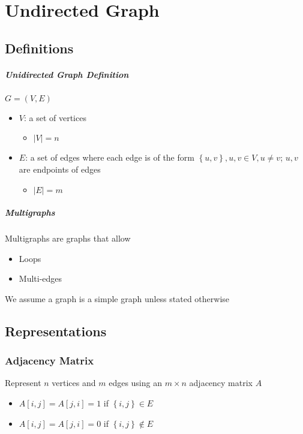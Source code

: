 \chapter{Undirected Graph}

\section{Definitions}

  \paragraph{Unidirected Graph Definition} $ G = \left( V, E \right) $
  \begin{itemize}
    \item $ V $: a set of vertices
    \begin{itemize}
      \item $ \left| V \right| = n $
    \end{itemize}

    \item $ E $: a set of edges where each edge is of the form
    $ \left\{ u, v \right\}, u, v \in V, u \ne v $; $ u, v $ are endpoints of
    edges
    \begin{itemize}
      \item $ \left| E \right| = m $
    \end{itemize}
  \end{itemize}

  \paragraph{Multigraphs} Multigraphs are graphs that allow
  \begin{itemize}
    \item Loops
    \item Multi-edges
  \end{itemize}
  We assume a graph is a simple graph unless stated otherwise

\section{Representations}

  \subsection{Adjacency Matrix}

    Represent $ n $ vertices and $ m $ edges using an $ m \times n $
    adjacency matrix $ A $
    \begin{itemize}
      \item $ A\left[ i, j \right] = A\left[ j, i \right] = 1 $ if
      $ \left\{ i, j \right\} \in E $
      \item $ A\left[ i, j \right] = A\left[ j, i \right] = 0 $ if
      $ \left\{ i, j \right\} \notin E $
    \end{itemize}

